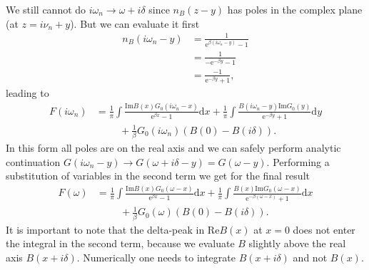 \documentclass[12pt,a4paper]{scrartcl}
\numberwithin{equation}{section}
\begin{document}
We still cannot do $i\omega_n \rightarrow \omega + i\delta$ since $n_B(z-y)$
has poles in the complex plane (at $z=i\nu_n+y$). But we can evaluate it first
\begin{align}
 n_B(i\omega_n-y) &= \frac{1}{\mathrm{e}^{\beta(i\omega_n-y)} - 1 } \\
 &= \frac{1}{-\mathrm{e}^{-\beta y} - 1 } \\
 &= \frac{-1}{\mathrm{e}^{-\beta y} + 1 } ,
\end{align}
leading to
\begin{align}
 F(i\omega_n)
 &=\frac{1}{\pi} \int \frac{\mathrm{Im}B(x) G_0(i\omega_n - x)}{ \mathrm{e}^{\beta x} - 1 } \mathrm{d}x 
  +\frac{1}{\pi} \int \frac{B(i\omega_n-y) \mathrm{Im}G_0(y) }{\mathrm{e}^{-\beta y} + 1 } \mathrm{d}y \nonumber \\
& \hspace{1cm} + \frac{1}{\beta} G_0(i\omega_n) \left( B(0) - B(i\delta) \right).
\end{align}
In this form all poles are on the real axis and we can safely perform analytic continuation
$G(i\omega_n-y) \rightarrow G(\omega + i\delta -y) = G(\omega  -y)$. 
Performing a substitution of variables in the second term we get for the final result
\begin{align}
 F(\omega)
 &=\frac{1}{\pi} \int \frac{\mathrm{Im}B(x) G_0(\omega - x)}{ \mathrm{e}^{\beta x} - 1 } \mathrm{d}x 
  +\frac{1}{\pi} \int \frac{B(x) \mathrm{Im}G_0(\omega - x) }{\mathrm{e}^{-\beta (\omega - x)} + 1 } \mathrm{d}x \nonumber \\
& \hspace{1cm} + \frac{1}{\beta} G_0(\omega) \left( B(0) - B(i\delta) \right).
\end{align}
It is important to note that the delta-peak in $\mathrm{Re}B(x)$ at $x=0$ does not enter the integral
in the second term, because we evaluate $B$ slightly above the real axis $B(x+i\delta)$.
Numerically one needs to integrate $B(x+i\delta)$ and not $B(x)$.
\end{document}
